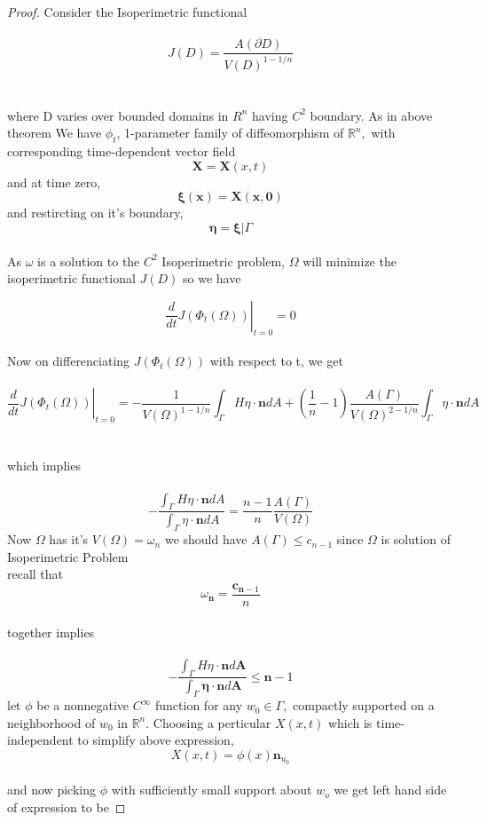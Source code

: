 \documentclass[oneside]{book}
\begin{document}
\begin{proof}

Consider the Isoperimetric functional \\\\
\begin{equation}
\label{eq35}
J(D)=\frac{A(\partial D)}{V(D)^{1-1 / n}}
 \end{equation}
 \\\\
where D varies over bounded domains in $R^{n}$ having $C^{2}$ boundary.
As in above \\ theorem We have $\phi_{t}$, 1-parameter family of diffeomorphism of $\mathbb{R}^{n},$ with corresponding time-dependent vector field $$\boldsymbol{X} = \boldsymbol{X}(x, t)$$ and at time zero,\\ $$\boldsymbol{\xi}(\boldsymbol{x})=\boldsymbol{X}(\boldsymbol{x}, \boldsymbol{0})$$ and  restircting on it's boundary,   \\      $$\boldsymbol{\eta}=\boldsymbol{\xi} | \Gamma $$ \\
As $\omega$ is a solution to the  $C^{2}$ Isoperimetric problem, $\Omega$ will minimize the isoperimetric functional $J(D)$ so we have


$$\left.\frac{d}{d t} J\left(\Phi_{t}(\Omega)\right)\right|_{t=0} = 0 $$ \\ 
Now on differenciating $J(\Phi_{t}(\Omega))$ with respect to t,
we get \\\\
$$\left.\frac{d}{d t} J\left(\Phi_{t}(\Omega)\right)\right|_{t=0} =  -\frac{1}{V(\Omega)^{1-1 / n}} \int_{\Gamma} H \eta \cdot \mathbf{n} d A+\left(\frac{1}{n}-1\right) \frac{A(\Gamma)}{V(\Omega)^{2-1 / n}} \int_{\Gamma} \eta \cdot \mathbf{n} d A 
$$ \\\\
which implies \\\\
$$
-\frac{\int_{\Gamma} H \eta \cdot \mathbf{n} d A}{\int_{\Gamma} \eta \cdot \mathbf{n} d A}=\frac{n-1}{n} \frac{A(\Gamma)}{V(\Omega)}
$$
Now $\Omega$ has it's $V(\Omega) = \omega_{n}$ we should have $A(\Gamma) \leq c_{n-1}$ since $\Omega $ is solution of Isoperimetric Problem \\
 recall that \\ $$ \omega_{\mathbf{n}}=\frac{\mathbf{c}_{\mathbf{n}-1}}{n}$$ \\
 together  implies \\\\
 \begin{equation}
 \label{eq36}
 -\frac{\int_{\Gamma} H \eta \cdot \mathbf{n} d \boldsymbol{A}}{\int_{\Gamma} \boldsymbol{\eta} \cdot \mathbf{n} d \boldsymbol{A}} \leq \boldsymbol{n}-1 
 \end{equation}
 let $\phi$ be a nonnegative $C^{\infty}$ function for any $w_{0} \in \Gamma,$ compactly supported on a neighborhood of $w_{0}$ in $\mathbb{R}^{n}$.
 Choosing a perticular $X(x, t)$ which is time-independent to  simplify above expression, \\
$$
X(x, t)=\phi(x) \mathbf{n}_{u_{0}}
$$
\\
and now picking $\phi$ with sufficiently small support about $w_{o}$ we get left hand side of expression to be 


\end{proof}
\end{document}
